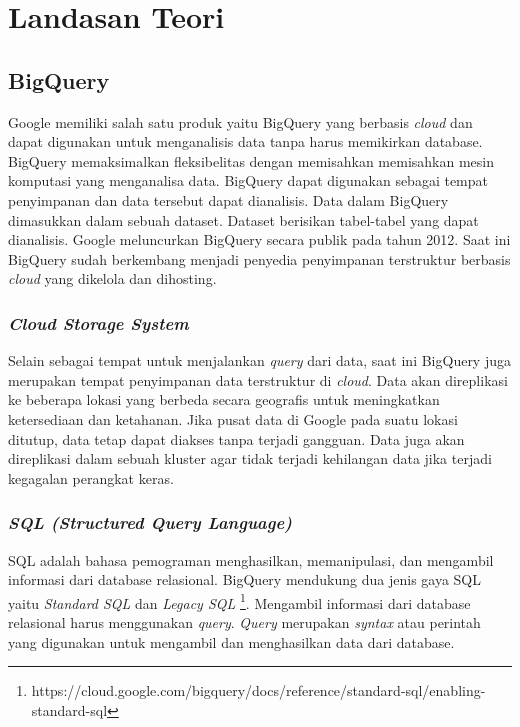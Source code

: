\chapter{Landasan Teori}
\label{chap:teori}

\section{BigQuery\cite{bqa, bqIntroduction}}
Google memiliki salah satu produk yaitu BigQuery yang berbasis \textit{cloud} dan dapat digunakan untuk menganalisis data tanpa harus memikirkan database. BigQuery memaksimalkan fleksibelitas dengan memisahkan memisahkan mesin komputasi yang menganalisa data. BigQuery dapat digunakan sebagai tempat penyimpanan dan data tersebut dapat dianalisis. Data dalam BigQuery dimasukkan dalam sebuah dataset. Dataset berisikan tabel-tabel yang dapat dianalisis. Google meluncurkan BigQuery secara publik pada tahun 2012. Saat ini BigQuery sudah berkembang menjadi penyedia penyimpanan terstruktur berbasis \textit{cloud} yang dikelola dan dihosting. 

\subsection{\textit{Cloud Storage System}}
Selain sebagai tempat untuk menjalankan \textit{query} dari data, saat ini BigQuery juga merupakan tempat penyimpanan data terstruktur di \textit{cloud}. Data akan direplikasi ke beberapa lokasi yang berbeda secara geografis untuk meningkatkan ketersediaan dan ketahanan. Jika pusat data di Google pada suatu lokasi ditutup, data tetap dapat diakses tanpa terjadi gangguan. Data juga akan direplikasi dalam sebuah kluster agar tidak terjadi kehilangan data jika terjadi kegagalan perangkat keras. 

\subsection{\textit{SQL (Structured Query Language) \cite{book:22611}}}
SQL adalah bahasa pemograman menghasilkan, memanipulasi, dan mengambil informasi dari database relasional. BigQuery mendukung dua jenis gaya SQL yaitu \textit{Standard SQL} dan \textit{Legacy SQL} \footnote{https://cloud.google.com/bigquery/docs/reference/standard-sql/enabling-standard-sql}. Mengambil informasi dari database relasional harus menggunakan \textit{query}. \textit{Query} merupakan \textit{syntax} atau perintah yang digunakan untuk mengambil dan menghasilkan data dari database.

